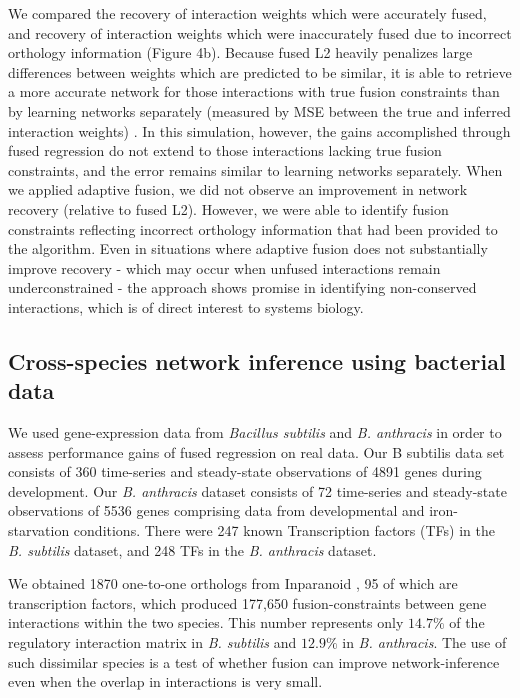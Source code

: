 \documentclass[11pt]{article}
\begin{document}
We compared the recovery of interaction weights which were accurately fused, and recovery of interaction weights which were inaccurately fused due to incorrect orthology information (Figure 4b). Because fused L2 heavily penalizes large differences between weights which are predicted to be similar, it is able to retrieve a more accurate network for those interactions with true fusion constraints than by learning networks separately (measured by MSE between the true and inferred interaction weights) . In this simulation, however, the gains accomplished through fused regression do not extend to those interactions lacking true fusion constraints, and the error remains similar to learning networks separately. When we applied adaptive fusion, we did not observe an improvement in network recovery (relative to fused L2). However, we were able to identify fusion constraints reflecting incorrect orthology information that had been provided to the algorithm. Even in situations where adaptive fusion does not substantially improve recovery - which may occur when unfused interactions remain underconstrained - the approach shows promise in identifying non-conserved interactions, which is of direct interest to systems biology. 


\subsection{Cross-species network inference using bacterial data}
We used gene-expression data from \textit{\textit{Bacillus subtilis}} and \textit{\textit{B. anthracis}} in order to assess performance gains of fused regression on real data. Our B subtilis data set consists of 360 time-series and steady-state observations of 4891 genes during development. Our \textit{\textit{B. anthracis}} dataset consists of 72 time-series and steady-state observations of 5536 genes comprising data from developmental and iron-starvation conditions. There were 247 known Transcription factors (TFs) in the \textit{\textit{B. subtilis}} dataset, and 248 TFs in the \textit{B. anthracis} dataset. 

We obtained 1870 one-to-one orthologs from Inparanoid \cite{ostlund_inparanoid_2010}, 95 of which are transcription factors, which produced 177,650 fusion-constraints between gene interactions within the two species. This number represents only $14.7\%$ of the regulatory interaction matrix in \textit{B. subtilis} and $12.9\%$ in \textit{B. anthracis}. The use of such dissimilar species is a test of whether fusion can improve network-inference even when the overlap in interactions is very small. 
\end{document}
